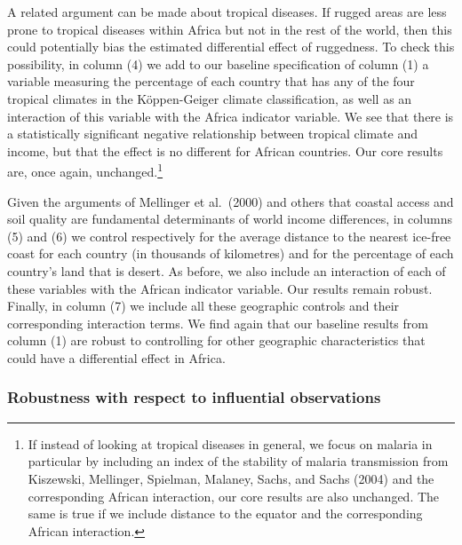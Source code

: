 \documentclass[
  letterpaper,
  DIV=11,
  numbers=noendperiod]{scrartcl}
\begin{document}
A related argument can be made about tropical diseases. If rugged areas
are less prone to tropical diseases within Africa but not in the rest of
the world, then this could potentially bias the estimated differential
effect of ruggedness. To check this possibility, in column (4) we add to
our baseline specification of column (1) a variable measuring the
percentage of each country that has any of the four tropical climates in
the Köppen-Geiger climate classification, as well as an interaction of
this variable with the Africa indicator variable. We see that there is a
statistically significant negative relationship between tropical climate
and income, but that the effect is no different for African countries.
Our core results are, once again, unchanged.\footnote{If instead of
  looking at tropical diseases in general, we focus on malaria in
  particular by including an index of the stability of malaria
  transmission from Kiszewski, Mellinger, Spielman, Malaney, Sachs, and
  Sachs (2004) and the corresponding African interaction, our core
  results are also unchanged. The same is true if we include distance to
  the equator and the corresponding African interaction.}

Given the arguments of Mellinger et al.~(2000) and others that coastal
access and soil quality are fundamental determinants of world income
differences, in columns (5) and (6) we control respectively for the
average distance to the nearest ice-free coast for each country (in
thousands of kilometres) and for the percentage of each country's land
that is desert. As before, we also include an interaction of each of
these variables with the African indicator variable. Our results remain
robust. Finally, in column (7) we include all these geographic controls
and their corresponding interaction terms. We find again that our
baseline results from column (1) are robust to controlling for other
geographic characteristics that could have a differential effect in
Africa.

\subsubsection{Robustness with respect to influential
observations}\label{robustness-with-respect-to-influential-observations}
\end{document}
